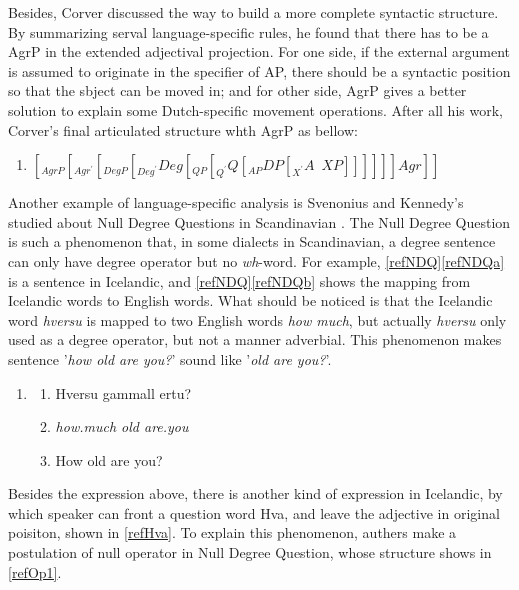 \documentclass{ctexart}
\let \cite \parencite
\begin{document}
Besides, Corver discussed the way to build a more complete syntactic structure. By summarizing serval language-specific rules, he found that there has to be a AgrP in the extended adjectival projection. For one side, if the external argument is assumed to originate in the specifier of AP, there should be a syntactic position so that the sbject can be moved in; and for other side, AgrP gives a better solution to explain some Dutch-specific movement operations. After all his work, Corver's final articulated structure whth AgrP as bellow:

\begin{enumerate}[resume]
\item

$[_{AgrP}[_{Agr^{\prime}}[_{DegP}[_{Deg^{\prime}}Deg[_{QP}[_{Q^{\prime}} Q [_{AP}DP[_{X^{\prime}}A \enspace XP]]]]]]Agr]]$
    
\end{enumerate}

Another example of language-specific analysis is Svenonius and Kennedy's studied about Null Degree Questions in Scandinavian \cite{svenonius2006}. The Null Degree Question is such a phenomenon that, in some dialects in Scandinavian, a degree sentence can only have degree operator but no \textit{wh}-word. For example, \ref{refNDQ}\ref{refNDQa} is a sentence in Icelandic, and \ref{refNDQ}\ref{refNDQb} shows the mapping from Icelandic words to English words. What should be noticed is that the Icelandic word \textit{hversu} is mapped to two English words \textit{how much}, but actually \textit{hversu} only used as a degree operator, but not a manner adverbial. This phenomenon makes sentence '\textit{how old are you?}' sound like '\textit{old are you?}'. 

\begin{enumerate}[resume]
\item \label{refNDQ}
\begin{enumerate}
\item \label{refNDQa} Hversu gammall ertu? 
\item \label{refNDQb} \textit{how.much old are.you}
\item \label{refNDQc} How old are you?
\end{enumerate}
\end{enumerate}

Besides the expression above, there is another kind of expression in Icelandic, by which speaker can front a question word Hva\dh, and leave the adjective in original poisiton, shown in \ref{refHva}. To explain this phenomenon, authers make a postulation of null operator in Null Degree Question, whose structure shows in \ref{refOp1}.
\end{document}
